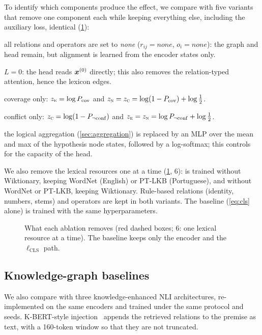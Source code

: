 To identify which components produce the effect, we compare \model{} with five variants that remove one
component each while keeping everything else, including the auxiliary loss, identical (\cref{fig:ablation-map}):
\begin{description}\itemsep0pt
  \item[w/o lexicon] all relations and operators are set to \emph{none}
    ($r_{ij}\!=\!\textit{none}$, $o_i\!=\!\textit{none}$): the graph and head remain, but alignment is
    learned from the encoder states only.
  \item[w/o graph] $L=0$: the head reads $\bm{x}^{(0)}$ directly; this also removes the relation-typed
    attention, hence the lexicon edges.
  \item[w/o conflict] coverage only: $z_{\textsc{e}}=\log P_{\mathrm{cov}}$ and $z_{\textsc{n}}=z_{\textsc{c}}=\log(1-P_{\mathrm{cov}})+\log\tfrac12$.
  \item[w/o coverage] conflict only: $z_{\textsc{c}}=\log(1-P_{\neg\mathrm{conf}})$ and $z_{\textsc{e}}=z_{\textsc{n}}=\log P_{\neg\mathrm{conf}}+\log\tfrac12$.
  \item[MLP head] the logical aggregation (\cref{sec:aggregation}) is replaced by an MLP over the mean and max
    of the hypothesis node states, followed by a log-softmax; this controls for the capacity of the head.
\end{description}

We also remove the lexical resources one at a time (\cref{fig:ablation-map}, 6): \model{} is trained
without Wiktionary, keeping WordNet (English) or PT-LKB (Portuguese), and without WordNet or PT-LKB,
keeping Wiktionary. Rule-based relations (identity, numbers, stems) and operators are kept in both
variants. The \cls{} baseline (\cref{eq:cls} alone) is trained with the same hyperparameters.

\begin{figure}[t]
  \centering
  
  \caption{What each ablation removes (red dashed boxes; 6: one lexical resource at a time). The \cls{}
  baseline keeps only the encoder and the $\ell_{\mathrm{CLS}}$ path.}
  \label{fig:ablation-map}
\end{figure}

\subsection{Knowledge-graph baselines}
\label{sec:baselines}

We also compare with three knowledge-enhanced NLI architectures, re-implemented on the same encoders
and trained under the same protocol and seeds. K-BERT-style injection~\citep{liu2020kbert} appends the
retrieved relations to the premise as text, with a 160-token window so that they are not truncated.

